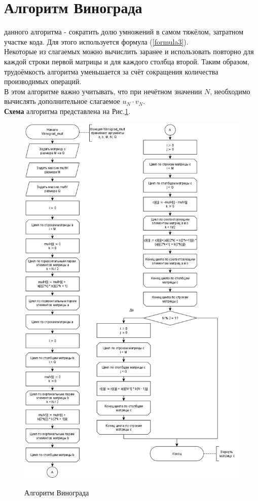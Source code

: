 \section{Алгоритм Винограда}
 данного алгоритма - сократить долю умножений в самом тяжёлом, затратном участке кода. Для этого используется формула (\ref{formula3}).\\

Некоторые из слагаемых можно вычислить заранее и использовать повторно для каждой строки первой матрицы и для каждого столбца второй. Таким образом, трудоёмкость алгоритма уменьшается за счёт сокращения количества производимых операций.\\

В этом алгоритме важно учитывать, что при нечётном значении $N$, необходимо вычислять дополнительное слагаемое $u_N \cdot v_N$.\\

\textbf{Схема} алгоритма представлена на Рис.\ref{fig2:image}.
\begin{figure}[h]
	\begin{center}
		{\includegraphics[scale = 0.49]{schemes/winograd}}
		\caption{Алгоритм Винограда}
		\label{fig2:image}
	\end{center}
\end{figure}

